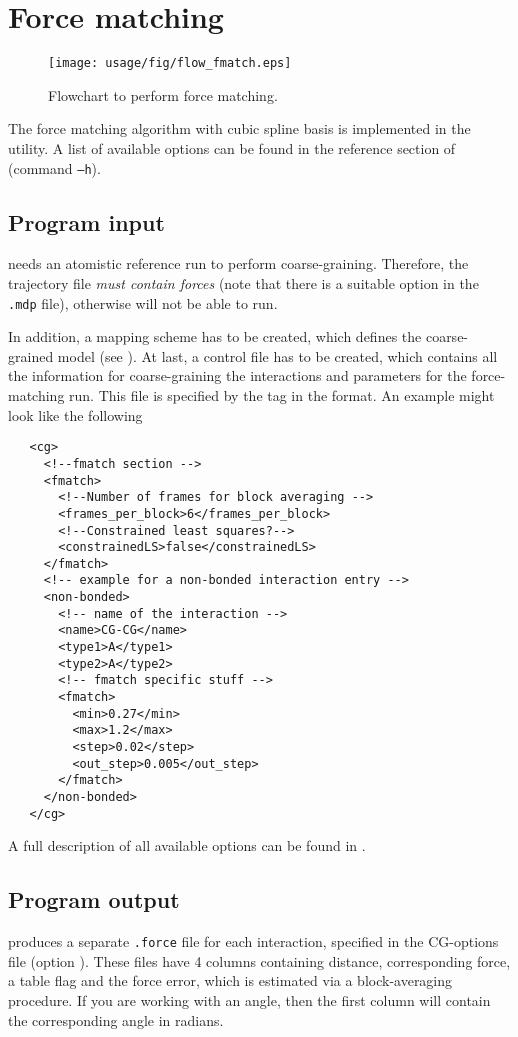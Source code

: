 \chapter{Force matching}
\begin{figure}
   \centering
   \texttt{[image: usage/fig/flow\_fmatch.eps]}
   \caption{Flowchart to perform force matching.}
\end{figure}
The force matching algorithm with cubic spline basis is implemented in the  utility. A list of available options can be found in the reference section of  (command \texttt{--h}).

\section{Program input}
 needs an atomistic reference run to perform coarse-graining. Therefore, the trajectory file {\em must contain forces } (note that there is a suitable option in the \gromacs \texttt{.mdp} file), otherwise  will not be able to run.

In addition, a mapping scheme has to be created, which defines the coarse-grained model (see ). At last, a control file has to be created, which contains all the information for coarse-graining the interactions and parameters for the force-matching run. This file is specified by the tag  in the \xml format. An example might look like the following
\begin{lstlisting}
   <cg>
     <!--fmatch section -->
     <fmatch>
       <!--Number of frames for block averaging -->
       <frames_per_block>6</frames_per_block>
       <!--Constrained least squares?-->
       <constrainedLS>false</constrainedLS>
     </fmatch>
     <!-- example for a non-bonded interaction entry -->
     <non-bonded>
       <!-- name of the interaction -->
       <name>CG-CG</name>
       <type1>A</type1>
       <type2>A</type2>
       <!-- fmatch specific stuff -->
       <fmatch>
         <min>0.27</min>
         <max>1.2</max>
         <step>0.02</step>
         <out_step>0.005</out_step>
       </fmatch>
     </non-bonded>
   </cg>
\end{lstlisting}
A full description of all available options can be found in .

\section{Program output}
 produces a separate \texttt{.force} file for each interaction, specified in the CG-options file (option ).
These files have 4 columns containing distance, corresponding force, a table flag and the force error, which is estimated via a block-averaging procedure.
If you are working with an angle, then the first column will contain the corresponding angle in radians.

